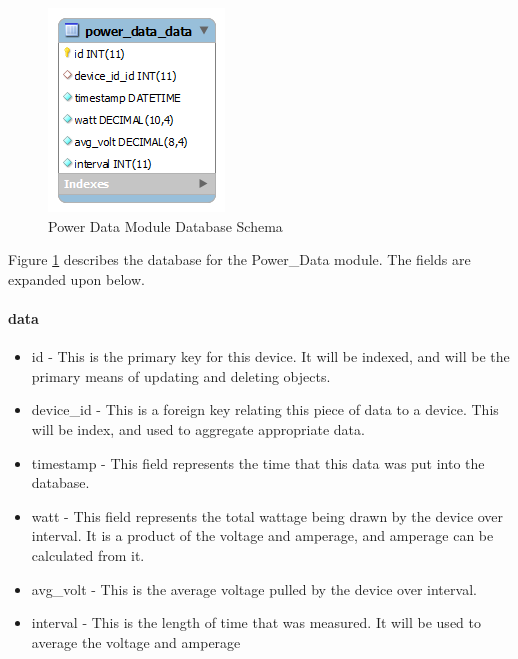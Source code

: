 \begin{figure}[H]
\centering
\includegraphics[scale=0.75]{Software/images/Database/Power Data.png}
\caption{Power Data Module Database Schema}
\label{img:S_Power_Data_Device}
\end{figure}

Figure \ref{img:S_Power_Data_Device} describes the database for the Power\_Data module. The fields are expanded upon below.

\paragraph{data}

\begin{itemize}
 \item id - This is the primary key for this device. It will be indexed, and will be the primary means of updating and deleting objects.
 \item device\_id - This is a foreign key relating this piece of data to a device. This will be index, and used to aggregate appropriate data.
 \item timestamp - This field represents the time that this data was put into the database.
 \item watt - This field represents the total wattage being drawn by the device over interval. It is a product of the voltage and amperage, and amperage can be calculated from it.
 \item avg\_volt - This is the average voltage pulled by the device over interval.
 \item interval - This is the length of time that was measured. It will be used to average the voltage and amperage
\end{itemize}